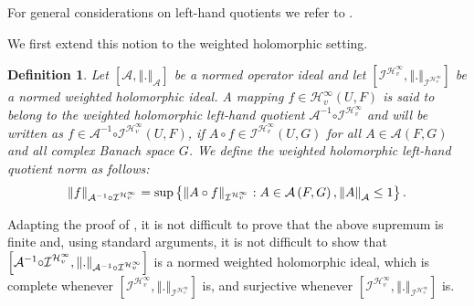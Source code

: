 \documentclass[12pt]{amsart}
\theoremstyle{plain}
\newtheorem{definition}[theorem]{Definition}
\numberwithin{equation}{section}
\begin{document}
For general considerations on left-hand quotients we refer to 
 \cite{Pietsch1980}. 
 
 We first extend this notion to the weighted holomorphic setting.

\begin{definition}\label{Def1}
Let $\left[ \mathcal{A},\left\Vert .\right\Vert _{\mathcal{A}}\right] $ be a
normed operator ideal and let $\left[ \mathcal{I}^{\mathcal{H}_{v}^{\infty
}},\left\Vert .\right\Vert _{\mathcal{I}^{\mathcal{H}_{v}^{\infty }}}\right] 
$ be a normed weighted holomorphic ideal. A mapping $f\in \mathcal{H}%
_{v}^{\infty }(U,F)$ is said to belong to the weighted holomorphic left-hand
quotient $\mathcal{A}^{-1}\mathcal{\circ I}^{\mathcal{H}_{v}^{\infty }}$ and
will be written as $f\in \mathcal{A}^{-1}\mathcal{\circ I}^{\mathcal{H}%
_{v}^{\infty }}\left( U,F\right) $, if $A\circ f\in \mathcal{I}^{\mathcal{H}%
_{v}^{\infty }}\left( U,G\right) $ for all $A\in \mathcal{A}\left(
F,G\right) $ and all complex Banach space $G$. We define the weighted
holomorphic left-hand quotient norm as follows:%
\begin{equation*}
\left\Vert f\right\Vert _{\mathcal{A}^{-1}\mathcal{\circ I}^{\mathcal{H}%
_{v}^{\infty }}}=\sup \left\{ \left\Vert A\circ f\right\Vert _{\mathcal{I}^{%
\mathcal{H}_{v}^{\infty }}}:A\in \mathcal{A}\left( F,G\right) ,\left\Vert
A\right\Vert _{\mathcal{A}}\leq 1\right\} .
\end{equation*}
\end{definition}

Adapting  the proof of \cite[Proposition 2.1]{JimAysRuiz24}, it is not difficult to prove that 
the above supremum  is finite and, using standard arguments, it is not difficult to show that  $\left[ \mathcal{A}%
^{-1}\mathcal{\circ I}^{\mathcal{H}_{v}^{\infty }},\left\Vert .\right\Vert _{%
\mathcal{A}^{-1}\mathcal{\circ I}^{\mathcal{H}_{v}^{\infty }}}\right]$ is a normed weighted holomorphic ideal, which is complete whenever $\left[ \mathcal{I}^{\mathcal{H}_{v}^{\infty
}},\left\Vert .\right\Vert _{\mathcal{I}^{\mathcal{H}_{v}^{\infty }}}\right] 
$ is, and surjective whenever $\left[ \mathcal{I}^{\mathcal{H}_{v}^{\infty
}},\left\Vert .\right\Vert _{\mathcal{I}^{\mathcal{H}_{v}^{\infty }}}\right] 
$ is.
\end{document}
